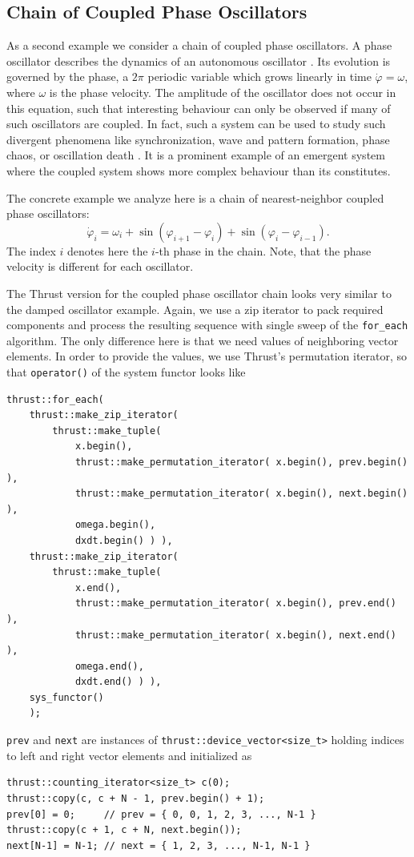 \documentclass[1p]{elsarticle}
\newcommand{\code}[1]{\lstinline|#1|}
\begin{document}
%
%
\subsection{Chain of Coupled Phase Oscillators}

As a second example we consider a chain of coupled phase
oscillators. A phase oscillator describes the dynamics of an
autonomous oscillator \cite{PhaseOscillator}. Its evolution is
governed by the phase, a $2\pi$ periodic variable which grows linearly
in time $\dot{\varphi} = \omega$, where $\omega$ is the phase
velocity. The amplitude of the oscillator does not occur in this
equation, such that interesting behaviour can only be observed if many
of such oscillators are coupled. In fact, such a system can be used to
study such divergent phenomena like synchronization, wave and pattern
formation, phase chaos, or oscillation death
\cite{Synchronization-Pikovsky,Kuramoto-84}. It is a prominent example
of an emergent system where the coupled system shows more complex
behaviour than its constitutes.


The concrete example we analyze here is a chain of nearest-neighbor
coupled phase oscillators:
\begin{equation} \label{eq:phasesystem}
    \dot{\varphi}_i = \omega_i + \sin( \varphi_{i+1} - \varphi_i) + \sin( \varphi_i
    - \varphi_{i-1}).
\end{equation}
The index $i$ denotes here the $i$-th phase in the chain. Note, that
the phase velocity is different for each oscillator.

The Thrust version for the coupled phase oscillator chain looks very similar to
the damped oscillator example. Again, we use a zip iterator to pack required
components and process the resulting sequence with single sweep of the
\code{for_each} algorithm. The only difference here is that we need values of
neighboring vector elements. In order to provide the values, we use Thrust's
permutation iterator, so that \code{operator()} of the system functor looks
like
\begin{lstlisting}
thrust::for_each(
    thrust::make_zip_iterator(
        thrust::make_tuple(
            x.begin(),
            thrust::make_permutation_iterator( x.begin(), prev.begin() ),
            thrust::make_permutation_iterator( x.begin(), next.begin() ),
            omega.begin(),
            dxdt.begin() ) ),
    thrust::make_zip_iterator(
        thrust::make_tuple(
            x.end(),
            thrust::make_permutation_iterator( x.begin(), prev.end() ),
            thrust::make_permutation_iterator( x.begin(), next.end() ),
            omega.end(),
            dxdt.end() ) ),
    sys_functor()
    );
\end{lstlisting}
\code{prev} and \code{next} are instances of
\code{thrust::device_vector<size_t>} holding indices to left and right vector
elements and initialized as
\begin{lstlisting}
thrust::counting_iterator<size_t> c(0);
thrust::copy(c, c + N - 1, prev.begin() + 1);
prev[0] = 0;     // prev = { 0, 0, 1, 2, 3, ..., N-1 }
thrust::copy(c + 1, c + N, next.begin());
next[N-1] = N-1; // next = { 1, 2, 3, ..., N-1, N-1 }
\end{lstlisting}
\end{document}
